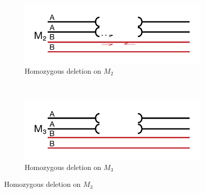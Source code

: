 \begin{figure}
    \centering
    \begin{subfigure}[b]{0.4\textwidth}
        \includegraphics[width=1\textwidth]{PolyMarker/Figures/deletions/homM2.pdf}
        \caption{Homozygous deletion on $M_{2}$}
        \label{fig:poly:homM2}
    \end{subfigure}
    ~ %
    \begin{subfigure}[b]{0.4\textwidth}
        \includegraphics[width=1\textwidth]{PolyMarker/Figures/deletions/homM3.pdf} 
        \caption{Homozygous deletion on  $M_{3}$}
        \label{fig:poly:homM3}
    \end{subfigure}
    

\end{figure}
